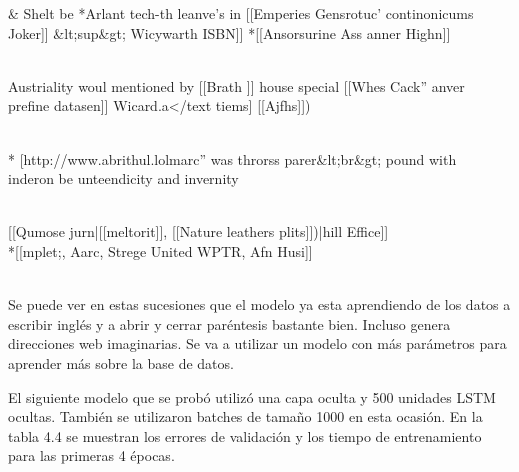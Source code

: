 \begin{table}[htbp]
\begin{center}
\begin{tabular}{&}
\hline
Shelt be *Arlant tech-th leanve's in [[Emperies Gensrotuc' continonicums \\ Joker]] \&lt;sup\&gt; Wicywarth ISBN]] *[[Ansorsurine Ass anner Highn]]
\\
\\ \hline

Austriality woul mentioned by [[Brath ]] house special [[Whes Cack'' anver \\ prefine datasen]] Wicard.a</text tiems] [[Ajfhs]])
\\ 
\\ \hline

* [http://www.abrithul.lolmarc'' was throrss parer\&lt;br\&gt; pound with \\ inderon be unteendicity and invernity
\\ 
\\ \hline

[[Qumose jurn|[[meltorit]], [[Nature leathers plits]])|hill Effice]] \\ *[[mplet;, Aarc, Strege United WPTR, Afn Husi]]
\\ 
\\ \hline


\end{tabular}
\caption{Sucesiones con primer modelo de Hutter}
\label{sucesiones hutter 1}
\end{center}
\end{table}

Se puede ver en estas sucesiones que el modelo ya esta aprendiendo de los datos a escribir inglés y a abrir y cerrar paréntesis bastante bien. Incluso genera direcciones web imaginarias. Se va a utilizar un modelo con más parámetros para aprender más sobre la base de datos.

\vspace{1em}

El siguiente modelo que se probó utilizó una capa oculta y 500 unidades LSTM ocultas. También se utilizaron batches de tamaño 1000 en esta ocasión. En la tabla 4.4 se muestran los errores de validación y los tiempo de entrenamiento  para las primeras 4 épocas.

